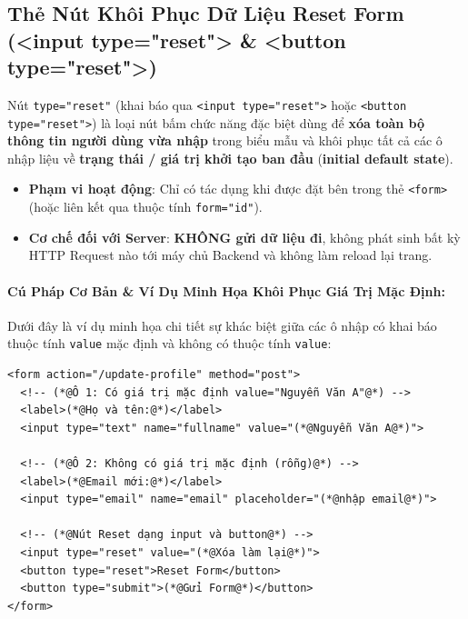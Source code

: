 \documentclass[11pt,oneside]{book}
\newcommand{\codeinline}[1]{\textcolor{accentOrange}{\texttt{#1}}}
\newcommand{\term}[1]{\textbf{\textcolor{primaryBlue}{#1}}}
\begin{document}
\subsection{Thẻ Nút Khôi Phục Dữ Liệu Reset Form (<input type="reset"> \& <button type="reset">)}
\label{subsec:form_reset_button}

\begin{conceptBox}
Nút \codeinline{type="reset"} (khai báo qua \codeinline{<input type="reset">} hoặc \codeinline{<button type="reset">}) là loại nút bấm chức năng đặc biệt dùng để \textbf{xóa toàn bộ thông tin người dùng vừa nhập} trong biểu mẫu và khôi phục tất cả các ô nhập liệu về \textbf{trạng thái / giá trị khởi tạo ban đầu} (\term{initial default state}).
\begin{itemize}[leftmargin=1.5em, itemsep=3pt, parsep=0pt]
    \item \textbf{Phạm vi hoạt động}: Chỉ có tác dụng khi được đặt bên trong thẻ \codeinline{<form>} (hoặc liên kết qua thuộc tính \codeinline{form="id"}).
    \item \textbf{Cơ chế đối với Server}: \textbf{KHÔNG gửi dữ liệu đi}, không phát sinh bất kỳ HTTP Request nào tới máy chủ Backend và không làm reload lại trang.
\end{itemize}
\end{conceptBox}

\paragraph{Cú Pháp Cơ Bản \& Ví Dụ Minh Họa Khôi Phục Giá Trị Mặc Định:}

Dưới đây là ví dụ minh họa chi tiết sự khác biệt giữa các ô nhập có khai báo thuộc tính \codeinline{value} mặc định và không có thuộc tính \codeinline{value}:

\begin{codeWindow}
\begin{lstlisting}[language=HTML5]
<form action="/update-profile" method="post">
  <!-- (*@Ô 1: Có giá trị mặc định value="Nguyễn Văn A"@*) -->
  <label>(*@Họ và tên:@*)</label>
  <input type="text" name="fullname" value="(*@Nguyễn Văn A@*)">

  <!-- (*@Ô 2: Không có giá trị mặc định (rỗng)@*) -->
  <label>(*@Email mới:@*)</label>
  <input type="email" name="email" placeholder="(*@nhập email@*)">

  <!-- (*@Nút Reset dạng input và button@*) -->
  <input type="reset" value="(*@Xóa làm lại@*)">
  <button type="reset">Reset Form</button>
  <button type="submit">(*@Gửi Form@*)</button>
</form>
\end{lstlisting}
\end{codeWindow}
\end{document}
